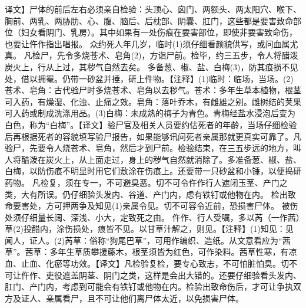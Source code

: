 \documentclass[12pt,UTF8]{ctexbook}
\begin{document}
译文】尸体的前后左右必须亲自检验：头顶心、囟门、两额头、两太阳穴、喉下、胸前、两乳、两胁肋、心、腹、脑后、后枕部、阴囊、肛门，这些都是要害致命部位（妇女看阴门、乳房）。其中如果有一处伤痕在要害部位，即使非要害致命伤，也要让仵作指出唱报。
众约死人年几岁，临时(1)须仔细看颜貌供写，或问血属尤真。
凡检尸，先令多烧苍术、皂角(2)，方诣尸前。检毕，约三五步，令人将醋泼炭火上，行从上过，其秽气自然去矣。
多备葱、椒、盐、白梅(3)，防其痕损不见处，借以拥罨。仍带一砂盆并捶，研上件物。【注释】(1)临时：临场，当场。(2)苍术、皂角：古代验尸时多烧苍术、皂角以去秽气。苍术：多年生草本植物，根茎可入药，有燥湿、化浊、止痛之效。皂角：落叶乔木，有雌雄之别。雌树结的荚果可入药或制成洗涤用品。(3)白梅：未成熟的梅子为青色。青梅经盐水浸泡后变为白色，称为“白梅”。【译文】验尸官及相关人员要约估死者的年龄，当场仔细检验后再根据死者的容貌填写验尸报告，如果能够讯问死者亲属那就更真实可靠了。凡验尸，先要令人烧苍术、皂角，然后才到尸前。检验结束，在三五步远的地方，叫人将醋泼在炭火上，从上面走过，身上的秽气自然就消除了。多准备葱、椒、盐、白梅，以防伤痕不明显时用它们敷涂在伤痕上。还要带一只砂盆和小锤，以便捣研药物。
凡检复，须在专一，不可避臭恶。切不可令仵作行人遮闭玉茎、产门之类，大有所误。仍仔细验头发内、谷道、产门内，虑有铁钉或他物在内。
检出致命要害处，方可押两争及知见(1)亲属令见。切不可容令近前，恐损害尸体。
被伤处须仔细量长阔、深浅、小大，定致死之由。
仵作、行人受嘱，多以芮（一作茜）草(2)投醋内，涂伤损处，痕皆不见。以甘草汁解之，则见。【注释】(1)知见：见闻人，证人。(2)芮草：俗称“狗尾巴草”，可用作编织、造纸。从文意看应为“茜草”。茜草：多年生草质攀援藤木，根茎须皆为红色，可作染料。茜草性寒，有凉血、止血、化瘀等功效。【译文】凡检验复检，要专心致志，不可怕脏怕臭。切不可让仵作、吏役遮盖阴茎、阴门之类，这样是会出大错的。还要仔细验看头发内、肛门、产门内，考虑到可能会有铁钉或他物在内。检验出致命伤后，才可让争执双方及证人、亲属看尸，且不可让他们离尸体太近，以免损害尸体。
\end{document}
